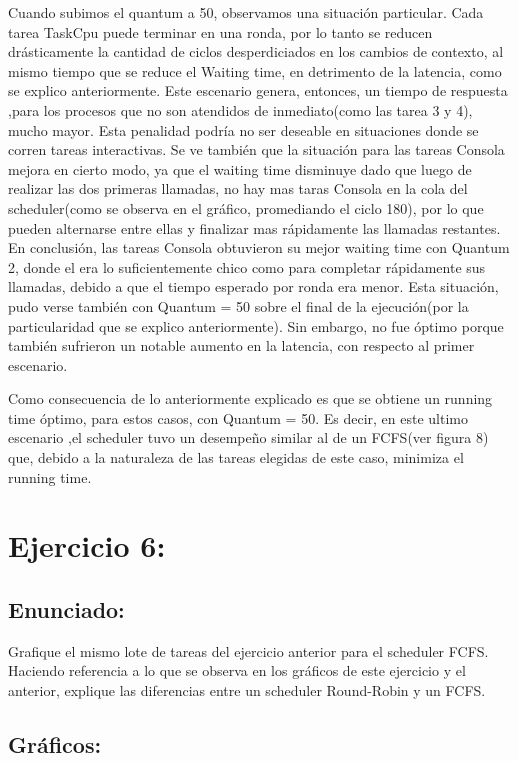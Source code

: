 \documentclass[10pt, a4paper]{article}
\begin{document}
Cuando subimos el quantum a 50, observamos una situación particular. Cada tarea TaskCpu puede terminar en una ronda, por lo tanto se reducen drásticamente la cantidad de ciclos desperdiciados en los cambios de contexto, al mismo tiempo que se reduce el Waiting time, en detrimento de la latencia, como se explico anteriormente. Este escenario genera, entonces, un tiempo de respuesta ,para los procesos que no son atendidos de inmediato(como las tarea 3 y 4), mucho mayor. Esta penalidad podría no ser deseable en situaciones donde se corren tareas interactivas.
Se ve también que la situación para las tareas Consola mejora en cierto modo, ya que el waiting time disminuye dado que luego de realizar las dos primeras llamadas, no hay mas taras Consola en la cola del scheduler(como se observa en el gráfico, promediando el ciclo 180), por lo que pueden alternarse entre ellas y finalizar mas rápidamente las llamadas restantes.
En conclusión, las tareas Consola obtuvieron su mejor waiting time con Quantum 2, donde el era lo suficientemente chico como para completar rápidamente sus llamadas, debido a que el tiempo esperado por ronda era menor. Esta situación, pudo verse también con Quantum = 50 sobre el final de la ejecución(por la particularidad que se explico anteriormente). Sin embargo, no fue óptimo porque también sufrieron un notable aumento en la latencia, con respecto al primer escenario.


Como consecuencia de lo anteriormente explicado es que se obtiene un running time óptimo, para estos casos, con Quantum = 50.
Es decir, en este ultimo escenario ,el scheduler tuvo un desempeño similar al de un FCFS(ver figura 8) que, debido a la naturaleza de las tareas elegidas de este caso, minimiza el running time.


\section{Ejercicio 6:}
	
\subsection{Enunciado:}
Grafique el mismo lote de tareas del ejercicio anterior para el scheduler FCFS.
Haciendo referencia a lo que se observa en los gráficos de este ejercicio y el anterior, explique las diferencias entre un scheduler Round-Robin y un FCFS.

\subsection{Gráficos:}
\end{document}
